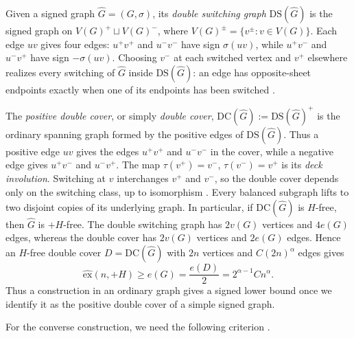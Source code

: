 \documentclass{article}
\newcommand{\DS}{\mathrm{DS}}
\newcommand{\DC}{\mathrm{DC}}
\newcommand{\ex}{\mathrm{ex}}
\newcommand{\hex}{\widehat{\ex}}
\theoremstyle{definition}
\theoremstyle{remark}
\begin{document}
Given a signed graph $\widehat G=(G,\sigma)$, its \emph{double switching
graph} $\DS(\widehat G)$ is the signed graph on
$V(G)^+\sqcup V(G)^-$, where $V(G)^\pm=\{v^\pm:v\in V(G)\}$.
Each edge $uv$ gives four edges: $u^+v^+$ and $u^-v^-$ have sign
$\sigma(uv)$, while $u^+v^-$ and $u^-v^+$ have sign $-\sigma(uv)$.
Choosing $v^-$ at each switched vertex and $v^+$ elsewhere realizes every
switching of $\widehat G$ inside $\DS(\widehat G)$: an edge has
opposite-sheet endpoints exactly when one of its endpoints has been
switched \cite[Section~5.2]{NaserasrSopenaZaslavsky2021}.

The \emph{positive double cover}, or simply \emph{double cover},
$\DC(\widehat G):=\DS(\widehat G)^+$ is the ordinary spanning graph
formed by the positive edges of $\DS(\widehat G)$. Thus a positive edge
$uv$ gives the edges $u^+v^+$ and $u^-v^-$ in the cover, while a negative
edge gives $u^+v^-$ and $u^-v^+$.
The map $\tau(v^+)=v^-$, $\tau(v^-)=v^+$ is its
\emph{deck involution}. Switching at $v$ interchanges $v^+$ and $v^-$,
so the double cover depends only on the switching class, up to isomorphism
\cite{Zaslavsky82,Zaslavsky98}.
Every balanced subgraph lifts to two disjoint copies of its underlying
graph. In particular, if $\DC(\widehat G)$ is $H$-free, then
$\widehat G$ is $+H$-free.
The double switching graph has $2v(G)$ vertices and $4e(G)$ edges,
whereas the double cover has $2v(G)$ vertices and $2e(G)$ edges.
Hence an $H$-free double cover $D=\DC(\widehat G)$ with $2n$ vertices
and $C(2n)^\alpha$ edges gives
\begin{equation}\label{eq:cover-transfer}
\hex(n,+H)\geq e(G)=\frac{e(D)}2=2^{\alpha-1}Cn^\alpha.
\end{equation}
Thus a construction in an ordinary graph gives a signed lower bound once
we identify it as the positive double cover of a simple signed graph.

For the converse construction, we need the following criterion
\cite[Theorem~1]{Zelinka1982}.
\end{document}
